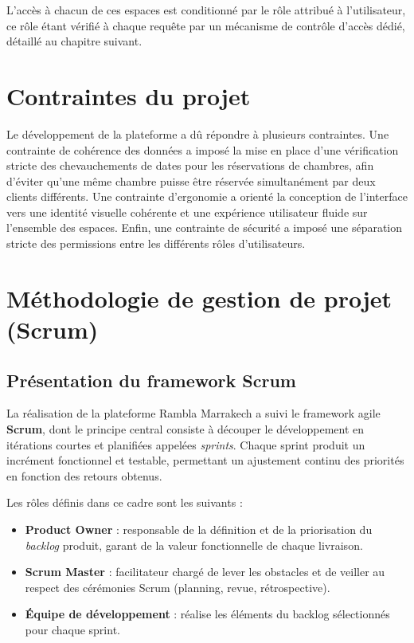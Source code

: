 \documentclass[12pt,a4paper]{report}
\begin{document}
L'accès à chacun de ces espaces est conditionné par le rôle attribué à
l'utilisateur, ce rôle étant vérifié à chaque requête par un mécanisme de
contrôle d'accès dédié, détaillé au chapitre suivant.

\section{Contraintes du projet}

Le développement de la plateforme a dû répondre à plusieurs contraintes.
Une contrainte de cohérence des données a imposé la mise en place d'une
vérification stricte des chevauchements de dates pour les réservations de
chambres, afin d'éviter qu'une même chambre puisse être réservée
simultanément par deux clients différents. Une contrainte d'ergonomie a
orienté la conception de l'interface vers une identité visuelle cohérente
et une expérience utilisateur fluide sur l'ensemble des espaces. Enfin,
une contrainte de sécurité a imposé une séparation stricte des
permissions entre les différents rôles d'utilisateurs.

\section{Méthodologie de gestion de projet (Scrum)}

\subsection{Présentation du framework Scrum}

La réalisation de la plateforme Rambla Marrakech a suivi le framework
agile \textbf{Scrum}, dont le principe central consiste à découper le
développement en itérations courtes et planifiées appelées
\textit{sprints}. Chaque sprint produit un incrément fonctionnel et
testable, permettant un ajustement continu des priorités en fonction des
retours obtenus.

Les rôles définis dans ce cadre sont les suivants :

\begin{itemize}
    \item \textbf{Product Owner} : responsable de la définition et de la
    priorisation du \textit{backlog} produit, garant de la valeur
    fonctionnelle de chaque livraison.
    \item \textbf{Scrum Master} : facilitateur chargé de lever les
    obstacles et de veiller au respect des cérémonies Scrum (planning,
    revue, rétrospective).
    \item \textbf{Équipe de développement} : réalise les éléments du
    backlog sélectionnés pour chaque sprint.
\end{itemize}
\end{document}
